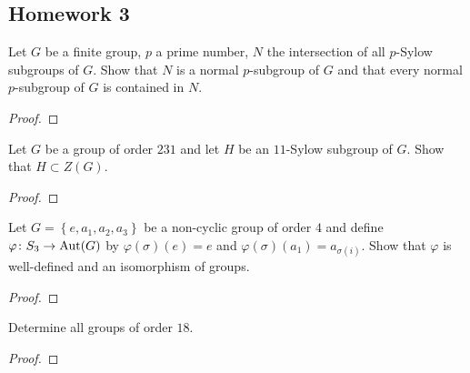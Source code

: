 \subsection{Homework 3}
\begin{problem}
  Let $G$ be a finite group, $p$ a prime number, $N$ the intersection of
  all $p$-Sylow subgroups of $G$. Show that $N$ is a normal $p$-subgroup of
  $G$ and that every normal $p$-subgroup of $G$ is contained in $N$.
\end{problem}
\begin{proof}
\end{proof}

\begin{problem}
  Let $G$ be a group of order $231$ and let $H$ be an $11$-Sylow subgroup
  of $G$. Show that $H\subset Z(G)$.
\end{problem}
\begin{proof}
\end{proof}

\begin{problem}
  Let $G=\left\{e,a_1,a_2,a_3\right\}$ be a non-cyclic group of order $4$
  and define $\varphi\colon S_3\to\operatorname{Aut}(G)$ by $\varphi(\sigma)(e)=e$ and
  $\varphi(\sigma)(a_1)=a_{\sigma(i)}$. Show that $\varphi$ is well-defined
  and an isomorphism of groups.
\end{problem}
\begin{proof}
\end{proof}

\begin{problem}
  Determine all groups of order $18$.
\end{problem}
\begin{proof}
\end{proof}


